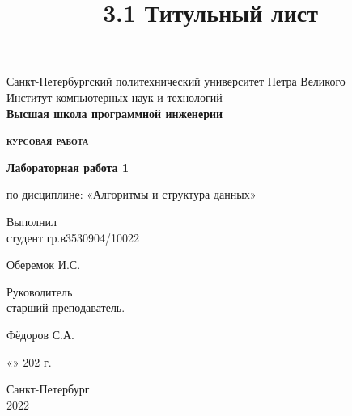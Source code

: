 \documentclass[a4paper,12pt]{article}
\title{3.1 Титульный лист}
\begin{document}
\thispagestyle{empty}	

\begin{center}
	Санкт-Петербургский политехнический университет Петра Великого\\
	Институт компьютерных наук и технологий\\
	\bfseries{Высшая школа программной инженерии}
\end{center}

\vspace{20ex} 

\begin{center}
	\begin{huge} {\bfseries{\scshape курсовая работа}} \end{huge}

	\vspace{3ex}

	{\bfseries Лабораторная работа 1}

	по дисциплине: «Алгоритмы и структура данных»
\end{center}

\vspace{30ex}

\noindent Выполнил\\
студент гр.в3530904/10022\hfill \begin{minipage}{0.6\textwidth} \hfill Оберемок И.С.\end{minipage}

\vspace{3ex}

\noindent Руководитель\\
старший преподаватель.\hfill \begin{minipage} {0.6\textwidth}\hfill Фёдоров С.А.\end{minipage}

\vspace{3ex}

\hfill \begin{minipage}{0.6\textwidth} \hfill «\underline{\hspace{0.1cm 23}}»\underline{\hspace{0.1cm мая}} 202\underline{\hspace{0.1cm 2}} г.\end{minipage}

\vfill

\begin{center}
	Санкт-Петербург\\ 
	2022
\end{center}
\end{document}

